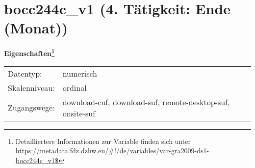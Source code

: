 
    \setcounter{footnote}{0}

    \vspace*{-1.8cm}
	\section{bocc244c\_v1 (4. Tätigkeit: Ende (Monat))}
	\label{section:bocc244c_v1}



    \vspace*{0.5cm}
    \noindent\textbf{Eigenschaften\footnote{Detailliertere Informationen zur Variable finden sich unter
		\url{https://metadata.fdz.dzhw.eu/\#!/de/variables/var-gra2009-ds1-bocc244c_v1$}}}\\
	\begin{tabularx}{\hsize}{@{}lX}
	Datentyp: & numerisch \\
	Skalenniveau: & ordinal \\
	Zugangswege: &
	  download-cuf, 
	  download-suf, 
	  remote-desktop-suf, 
	  onsite-suf
 \\
    \end{tabularx}



